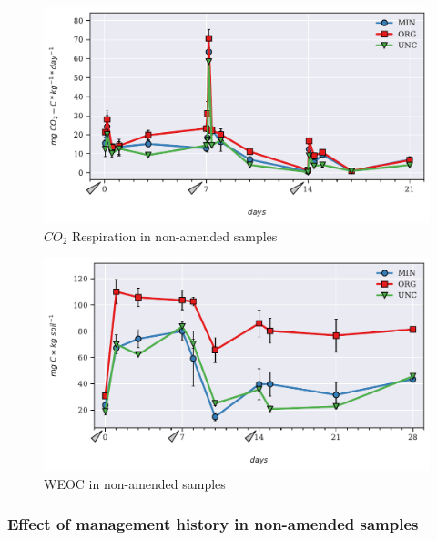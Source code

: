 \documentclass[12pt]{report}
\begin{document}
		\begin{figure}[H]
			\centering
			\includegraphics[scale=0.8]{thesis_figures/main_incubation/control/Resp.pdf}
			\caption{$CO_2$ Respiration in non-amended samples}
			\label{fig:resp_control_main}
		\end{figure}
	
		\begin{figure}[H]
			\centering
			\includegraphics[scale=0.8]{thesis_figures/main_incubation/control/WEOC.pdf}
			\caption{WEOC in non-amended samples}
			\label{fig:weoc_control_main}
		\end{figure}
	
	\subsubsection{Effect of management history in non-amended samples}
		
\end{document}
